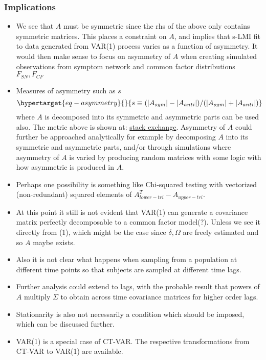 \documentclass[
  letterpaper,
  DIV=11,
  numbers=noendperiod]{scrartcl}
\let\oldparagraph\paragraph
\renewcommand{\paragraph}[1]{\oldparagraph{#1}\mbox{}}
\providecommand{\tightlist}{%
  \setlength{\itemsep}{0pt}\setlength{\parskip}{0pt}}\usepackage{longtable,booktabs,array}
\begin{document}
\hypertarget{implications}{%
\subsubsection{Implications}\label{implications}}

\begin{itemize}
\tightlist
\item
  We see that \(A\) must be symmetric since the rhs of the above only
  contains symmetric matrices. This places a constraint on \(A\), and
  implies that s-LMI fit to data generated from VAR(1) process varies as
  a function of asymmetry. It would then make sense to focus on
  asymmetry of \(A\) when creating simulated observations from symptom
  network and common factor distributions \(F_{SN},F_{CF}\)
\item
  Measures of asymmetry such as \(s\)
  \begin{equation}\protect\hypertarget{eq-asymmetry}{}{
  s \equiv (|A_{sym}|-|A_{anti}|)/(|A_{sym}|+|A_{anti}|)
  }\label{eq-asymmetry}\end{equation} where \(A\) is decomposed into its
  symmetric and asymmetric parts can be used also. The metric above is
  shown at:
  \href{https://math.stackexchange.com/questions/2048817/metric-for-how-symmetric-a-matrix-is}{stack
  exchange}. Asymmetry of \(A\) could further be approached analytically
  for example by decomposing \(A\) into its symmetric and asymmetric
  parts, and/or through simulations where asymmetry of \(A\) is varied
  by producing random matrices with some logic with how asymmetric is
  produced in \(A\).
\item
  Perhaps one possibility is something like Chi-squared testing with
  vectorized (non-redundant) squared elements of
  \(A_{lower-tri}^T-A_{upper-tri}\).
\item
  At this point it still is not evident that VAR(1) can generate a
  covariance matrix perfectly decomposable to a common factor model(?).
  Unless we see it directly from (1), which might be the case since
  \(\delta, \Omega\) are freely estimated and so \(A\) maybe exists.
\item
  Also it is not clear what happens when sampling from a population at
  different time points so that subjects are sampled at different time
  lags.
\item
  Further analysis could extend to lags, with the probable result that
  powers of \(A\) multiply \(\Sigma\) to obtain across time covariance
  matrices for higher order lags.
\item
  Stationarity is also not necessarily a condition which should be
  imposed, which can be discussed further.
\item
  VAR(1) is a special case of CT-VAR. The respective transformations
  from CT-VAR to VAR(1) are available.
\end{itemize}

\hypertarget{section}{%
\paragraph{}\label{section}}
\end{document}
